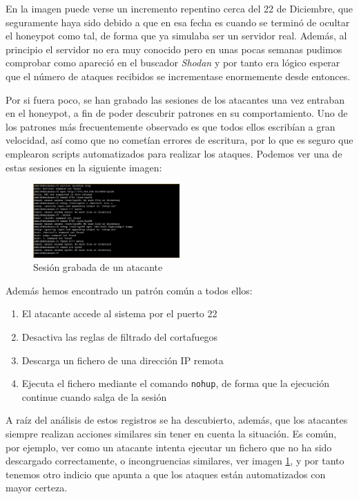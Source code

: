 \documentclass[journal]{IEEEtran}
\begin{document}
En la imagen puede verse un incremento repentino cerca del 22 de Diciembre, que seguramente haya sido debido a que en esa fecha es cuando se terminó de ocultar el honeypot como tal, de forma que ya simulaba ser un servidor real. Además, al principio el servidor no era muy conocido pero en unas pocas semanas pudimos comprobar como apareció en el buscador \textit{Shodan} \cite{shodan} y por tanto era lógico esperar que el número de ataques recibidos se incrementase enormemente desde entonces.

Por si fuera poco, se han grabado las sesiones de los atacantes una vez entraban en el honeypot, a fin de poder descubrir patrones en su comportamiento. Uno de los patrones más frecuentemente observado es que todos ellos escribían a gran velocidad, así como que no cometían errores de escritura, por lo que es seguro que emplearon scripts automatizados para realizar los ataques. Podemos ver una de estas sesiones en la siguiente imagen:

\begin{figure}[H]
\centering
\includegraphics[width=0.5\textwidth]{img/session}
\caption{Sesión grabada de un atacante}
\label{fig:session}
\end{figure}

Además hemos encontrado un patrón común a todos ellos:
\begin{enumerate}
\item El atacante accede al sistema por el puerto 22
\item Desactiva las reglas de filtrado del cortafuegos
\item Descarga un fichero de una dirección IP remota
\item Ejecuta el fichero mediante el comando {\tt nohup}, de forma que la ejecución continue cuando salga de la sesión
\end{enumerate}

A raíz del análisis de estos registros se ha descubierto, además, que los atacantes siempre realizan acciones similares sin tener en cuenta la situación. Es común, por ejemplo, ver como un atacante intenta ejecutar un fichero que no ha sido descargado correctamente, o incongruencias similares, ver imagen \ref{fig:session}, y por tanto tenemos otro indicio que apunta a que los ataques están automatizados con mayor certeza.
\end{document}
